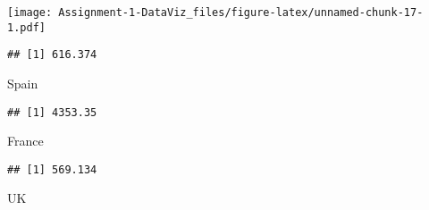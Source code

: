\documentclass[
]{article}
\newenvironment{Shaded}{\begin{snugshade}}{\end{snugshade}}
\newcommand{\FunctionTok}[1]{\textcolor[rgb]{0.00,0.00,0.00}{#1}}
\newcommand{\NormalTok}[1]{#1}
\newcommand{\OtherTok}[1]{\textcolor[rgb]{0.56,0.35,0.01}{#1}}
\newcommand{\SpecialCharTok}[1]{\textcolor[rgb]{0.00,0.00,0.00}{#1}}
\begin{document}
\texttt{[image: Assignment-1-DataViz\_files/figure-latex/unnamed-chunk-17-1.pdf]}

\begin{Shaded}
\end{Shaded}

\begin{verbatim}
## [1] 616.374
\end{verbatim}

\begin{Shaded}
\begin{Highlighting}[]
\NormalTok{Spain}
\end{Highlighting}
\end{Shaded}

\begin{verbatim}
## [1] 4353.35
\end{verbatim}

\begin{Shaded}
\begin{Highlighting}[]
\NormalTok{France}
\end{Highlighting}
\end{Shaded}

\begin{verbatim}
## [1] 569.134
\end{verbatim}

\begin{Shaded}
\begin{Highlighting}[]
\NormalTok{UK}
\end{Highlighting}
\end{Shaded}
\end{document}
